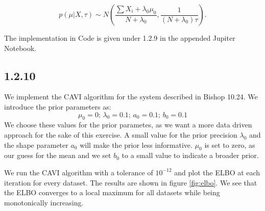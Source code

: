 \documentclass{article}
\begin{document}
\begin{multicols}{2}
    \begin{equation}
    p(\mu | X, \tau) \sim N\left(\frac{\sum X_i + \lambda_0 \mu_0}{N + \lambda_0}, \frac{1}{(N + \lambda_0) \tau}\right).
    \end{equation}

    The implementation in Code is given under 1.2.9 in the appended Jupiter Notebook.

    \subsection*{1.2.10}

    We implement the CAVI algorithm for the system described in Bishop 10.24. We introduce the prior parameters as:
    \begin{equation*}
        \mu_0 = 0; \,
        \lambda_0 = 0.1;\,
        a_0 = 0.1;\,
        b_0 = 0.1
    \end{equation*}
    We choose these values for the prior parametes, as we want a more data driven approach for the sake of this exercise. A small value for the prior precision $\lambda_0$ and the shape parameter $a_0$ will make the prior less informative. $\mu_0$ is set to zero, as our guess for the mean and we set $b_0$ to a small value to indicate a broader prior.

    \par
    We run the CAVI algorithm with a tolerance of $10^{-12}$ and plot the ELBO at each iteration for every dataset. The results are shown in figure \autoref{fig:elbo}. We see that the ELBO converges to a local maximum for all datasets while being monotonically increasing.


\end{multicols}
\end{document}

